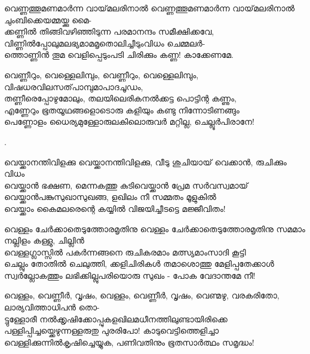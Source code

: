 \begin{enumerate}

\begin{slokam}{\VSv}{\VKG}{വെണ്ണത്തൂമണമാർന്ന വായ്‌മലരിനാൽ}
 വെണ്ണത്തൂമണമാർന്ന വായ്‌മലരിനാൽ ചുംബിക്കെയമ്മയ്ക്കു മൈ-\\
ക്കണ്ണിൽ തിങ്ങിവഴിഞ്ഞിടുന്ന പരമാനന്ദം സമീക്ഷിക്കവേ,\\
വിണ്ണിൽപ്പോലുമലഭ്യമാമമൃതൊലിച്ചീടുംവിധം ചെമ്മലർ-\\
ത്തൊണ്ണിൻ തൂമ വെളിപ്പെടുംപടി ചിരിക്കും കണ്ണ! കാക്കേണമേ.
\end{slokam}


\begin{slokam}{\VSr}{\Unk}{വെണ്ണീറും, വെള്ളെലിമ്പും,}
 വെണ്ണീറും, വെള്ളെലിമ്പും, വിഷധരവിലസത്‌പാമ്പുമാപാദചൂഡം,\\
തണ്ണീരെപ്പോഴുമോലും, തലയിലെരികനൽക്കട്ട പൊട്ടിന്റ കണ്ണും,\\
എണ്ണേറും ഭൂതയൂഥങ്ങളൊടൊരു കളിയും കണ്ടു നിന്നോടിണങ്ങും\\
പെണ്ണോളം ധൈര്യമുള്ളോരുലകിലൊരുവർ മറ്റില്ല, ചെല്ലൂർപിരാനേ!
\end{slokam}


. 

\begin{slokam}{\VSv}{\Unk}{വെയ്ക്കാനന്തിവിളക്കു}
 വെയ്ക്കാനന്തിവിളക്കു, വീടു ശുചിയായ്‌ വെക്കാൻ, രുചിക്കും വിധം\\
വെയ്ക്കാൻ ഭക്ഷണ, മെന്നകത്തു കുടിവെയ്ക്കാൻ പ്രേമ സർവസ്വമായ്‌\\
വെയ്ക്കാൻപങ്കുസുഖാസുഖങ്ങ, ളഖിലം നീ സമ്മതം മൂളുകിൽ\\
വെയ്ക്കാം കൈമലരെന്റെ കയ്യിൽ വിജയിച്ചീടട്ടെ മജ്ജീവിതം!
\end{slokam}


\begin{slokam}{\VSr}{\CKP}{വെള്ളം ചേർക്കാതെടുത്തോരമൃതിനു}
 വെള്ളം ചേർക്കാതെടുത്തോരമൃതിനു സമമാം നല്ലിളം കള്ളു, ചില്ലിൻ\\
വെള്ളഗ്ലാസ്സിൽ പകർന്നങ്ങനെ രുചികരമാം മത്സ്യമാംസാദി കൂട്ടി\\
ചെല്ലും തോതിൽ ചെലുത്തി, ക്കളിചിരികള്‍ തമാശൊത്തു മേളിപ്പതേക്കാള്‍\\
സ്വർല്ലോകത്തും ലഭിക്കില്ലുപരിയൊരു സുഖം - പോക വേദാന്തമേ നീ!
\end{slokam}


\begin{slokam}{\VSr}{\SVL}{വെള്ളം, വെണ്ണീർ, വൃഷം,}
 വെള്ളം, വെണ്ണീർ, വൃഷം, വെണ്മഴു, വരകരിതോ, ലാര്യവിത്താധിപൻ തൊ-\\
ട്ടുള്ളോരീ നൽക്കൃഷിക്കോപ്പുകളഖിലമധീനത്തിലുണ്ടായിരിക്കെ\\
പള്ളിപ്പിച്ചയ്ക്കെഴുന്നള്ളരുതു പുരരിപോ! കാടുവെട്ടിത്തെളിച്ചാ\\
വെള്ളിക്കുന്നിൽകൃഷിച്ചെയ്യുക, പണിവതിനും ഭൂതസാർത്ഥം സമൃദ്ധം!
\end{slokam}


\end{enumerate}
